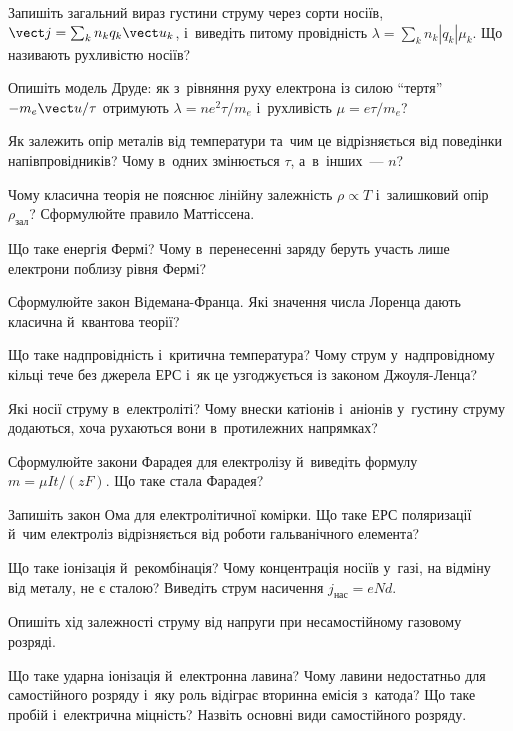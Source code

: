 \begin{Questions}
	\begin{quizlist}
		\item Запишіть загальний вираз густини струму через сорти носіїв, $\vect j=\sum_k
		  n_kq_k\vect u_k$, і~виведіть питому провідність $\lambda=\sum_k n_k|q_k|\mu_k$.
		  Що називають рухливістю носіїв?
		\item Опишіть модель Друде: як з~рівняння руху електрона із силою \enquote{тертя}
		  $-m_e\vect u/\tau$ отримують $\lambda=ne^2\tau/m_e$ і~рухливість
		  $\mu=e\tau/m_e$?
		\item Як залежить опір металів від температури та~чим це відрізняється від
		  поведінки напівпровідників? Чому в~одних змінюється $\tau$, а~в~інших~--- $n$?
		\item Чому класична теорія не пояснює лінійну залежність $\rho\propto T$
		  і~залишковий опір $\rho_{\text{зал}}$? Сформулюйте правило Маттіссена.
		\item Що таке енергія Фермі? Чому в~перенесенні заряду беруть участь лише
		  електрони поблизу рівня Фермі?
		\item Сформулюйте закон Відемана-Франца. Які значення числа Лоренца дають класична
		  й~квантова теорії?
		\item Що таке надпровідність і~критична температура? Чому струм у~надпровідному
		  кільці тече без джерела ЕРС і~як це узгоджується із законом Джоуля-Ленца?
		\item Які носії струму в~електроліті? Чому внески катіонів і~аніонів у~густину
		  струму додаються, хоча рухаються вони в~протилежних напрямках?
		\item Сформулюйте закони Фарадея для електролізу й~виведіть формулу $m=\mu
		  It/(zF)$. Що таке стала Фарадея?
		\item Запишіть закон Ома для електролітичної комірки. Що таке ЕРС поляризації
		  й~чим електроліз відрізняється від роботи гальванічного елемента?
		\item Що таке іонізація й~рекомбінація? Чому концентрація носіїв у~газі, на
		  відміну від металу, не є сталою? Виведіть струм насичення $j_{\text{нас}}=eNd$.
		\item Опишіть хід залежності струму від напруги при несамостійному газовому
		  розряді.
		\item Що таке ударна іонізація й~електронна лавина? Чому лавини недостатньо для
		  самостійного розряду і~яку роль відіграє вторинна емісія з~катода? Що таке
		  пробій і~електрична міцність? Назвіть основні види самостійного розряду.

\end{quizlist}
\end{Questions}
